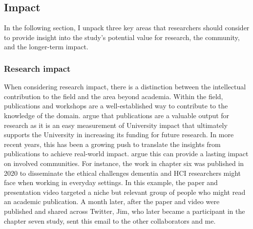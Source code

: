 \subsection{Impact}
\label{Impact}
In the following section, I unpack three key areas that researchers should consider to provide insight into the study's potential value for research, the community, and the longer-term impact.

\subsubsection{Research impact}
When considering research impact, there is a distinction between the intellectual contribution to the field and the area beyond academia. Within the field, publications and workshops are a well-established way to contribute to the knowledge of the domain. \cite{knight2022rather} argue that publications are a valuable output for research as it is an easy measurement of University impact that ultimately supports the University in increasing its funding for future research. In more recent years, this has been a growing push to translate the insights from publications to achieve real-world impact. \cite{moore2022translating} argue this can provide a lasting impact on involved communities. For instance, the work in chapter six was published in 2020 to disseminate the ethical challenges dementia and HCI researchers might face when working in everyday settings. In this example, the paper and presentation video targeted a niche but relevant group of people who might read an academic publication. A month later, after the paper and video were published and shared across Twitter, Jim, who later became a participant in the chapter seven study, sent this email to the other collaborators and me.

